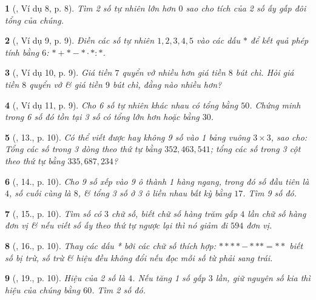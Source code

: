 \documentclass{article}
\newtheorem{baitoan}{}
\begin{document}
\begin{baitoan}[\cite{Binh_Toan_6_tap_1}, Ví dụ 8, p. 8]
	Tìm 2 số tự nhiên lớn hơn $0$ sao cho tích của 2 số ấy gấp đôi tổng của chúng.
\end{baitoan}

\begin{baitoan}[\cite{Binh_Toan_6_tap_1}, Ví dụ 9, p. 9]
	Điền các số tự nhiên $1,2,3,4,5$ vào các dấu $*$ để kết quả phép tính bằng $6$:  $*+*-*\cdot*:*$.
\end{baitoan}

\begin{baitoan}[\cite{Binh_Toan_6_tap_1}, Ví dụ 10, p. 9]
	Giá tiền $7$ quyển vở nhiều hơn giá tiền $8$ bút chì. Hỏi giá tiền $8$ quyển vở \& giá tiền $9$ bút chì, đằng nào nhiều hơn?
\end{baitoan}

\begin{baitoan}[\cite{Binh_Toan_6_tap_1}, Ví dụ 11, p. 9]
	Cho 6 số tự nhiên khác nhau có tổng bằng $50$. Chứng minh trong 6 số đó tồn tại 3 số có tổng lớn hơn hoặc bằng $30$.	
\end{baitoan}

\begin{baitoan}[\cite{Binh_Toan_6_tap_1}, 13., p. 10]
	Có thể viết được hay không 9 số vào 1 bảng vuông $3\times 3$, sao cho: Tổng các số trong 3 dòng theo thứ tự bằng $352, 463, 541$; tổng các số trong 3 cột theo thứ tự bằng $335, 687, 234$?
\end{baitoan}

\begin{baitoan}[\cite{Binh_Toan_6_tap_1}, 14., p. 10]
	Cho 9 số xếp vào 9 ô thành 1 hàng ngang, trong đó số đầu tiên là $4$, số cuối cùng là $8$, \& tổng 3 số ở 3 ô liền nhau bất kỳ bằng $17$. Tìm 9 số đó.
\end{baitoan}

\begin{baitoan}[\cite{Binh_Toan_6_tap_1}, 15., p. 10]
	Tìm số có $3$ chữ số, biết chữ số hàng trăm gấp $4$ lần chữ số hàng đơn vị \& nếu viết số ấy theo thứ tự ngược lại thì nó giảm đi $594$ đơn vị.
\end{baitoan}

\begin{baitoan}[\cite{Binh_Toan_6_tap_1}, 16., p. 10]
	Thay các dấu * bởi các chữ số thích hợp: $**** - *** = **$ biết số bị trừ, số trừ \& hiệu đều không đổi nếu đọc mỗi số từ phải sang trái.
\end{baitoan}

\begin{baitoan}[\cite{Binh_Toan_6_tap_1}, 19., p. 10]
	Hiệu của 2 số là $4$. Nếu tăng 1 số gấp $3$ lần, giữ nguyên số kia thì hiệu của chúng bằng $60$. Tìm 2 số đó.
\end{baitoan}
\end{document}
